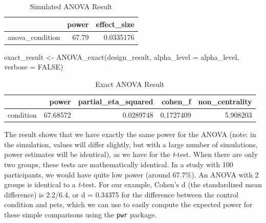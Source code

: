\documentclass[
]{book}
\newenvironment{Shaded}{\begin{snugshade}}{\end{snugshade}}
\newcommand{\AttributeTok}[1]{\textcolor[rgb]{0.77,0.63,0.00}{#1}}
\newcommand{\ConstantTok}[1]{\textcolor[rgb]{0.00,0.00,0.00}{#1}}
\newcommand{\DecValTok}[1]{\textcolor[rgb]{0.00,0.00,0.81}{#1}}
\newcommand{\FloatTok}[1]{\textcolor[rgb]{0.00,0.00,0.81}{#1}}
\newcommand{\FunctionTok}[1]{\textcolor[rgb]{0.00,0.00,0.00}{#1}}
\newcommand{\NormalTok}[1]{#1}
\newcommand{\OtherTok}[1]{\textcolor[rgb]{0.56,0.35,0.01}{#1}}
\newcommand{\SpecialCharTok}[1]{\textcolor[rgb]{0.00,0.00,0.00}{#1}}
\newcommand{\StringTok}[1]{\textcolor[rgb]{0.31,0.60,0.02}{#1}}
\begin{document}
\begin{table}[!h]

\caption{\label{tab:unnamed-chunk-33}Simulated ANOVA Result}
\centering
\begin{tabular}[t]{l|r|r}
\hline
  & power & effect\_size\\
\hline
anova\_condition & 67.79 & 0.0335176\\
\hline
\end{tabular}
\end{table}

\begin{Shaded}
\begin{Highlighting}[]
\NormalTok{exact\_result }\OtherTok{\textless{}{-}} \FunctionTok{ANOVA\_exact}\NormalTok{(design\_result,}
                            \AttributeTok{alpha\_level =}\NormalTok{ alpha\_level,}
                            \AttributeTok{verbose =} \ConstantTok{FALSE}\NormalTok{)}
\end{Highlighting}
\end{Shaded}

\begin{table}[!h]

\caption{\label{tab:unnamed-chunk-35}Exact ANOVA Result}
\centering
\begin{tabular}[t]{l|r|r|r|r}
\hline
  & power & partial\_eta\_squared & cohen\_f & non\_centrality\\
\hline
condition & 67.68572 & 0.0289748 & 0.1727409 & 5.908203\\
\hline
\end{tabular}
\end{table}

The result shows that we have exactly the same power for the ANOVA (note: in the simulation, values will differ slightly, but with a large number of simulations, power estimates will be identical), as we have for the \emph{t}-test. When there are only two groups, these tests are mathematically identical. In a study with 100 participants, we would have quite low power (around 67.7\%). An ANOVA with 2 groups is identical to a \emph{t}-test. For our example, Cohen's d (the standardized mean difference) is 2.2/6.4, or d = 0.34375 for the difference between the control condition and pets, which we can use to easily compute the expected power for these simple comparisons using the \texttt{pwr} \citeyearpar{R-pwr} package.

\begin{Shaded}
\end{Shaded}
\end{document}
